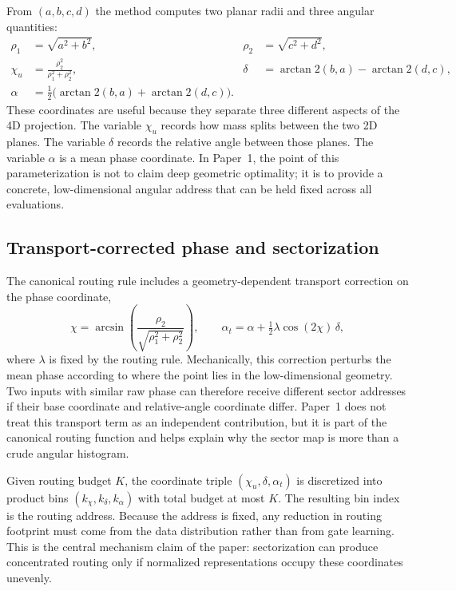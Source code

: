 \documentclass{article}
\begin{document}
From $(a,b,c,d)$ the method computes two planar radii and three angular quantities:
\begin{align}
\rho_1 &= \sqrt{a^2+b^2}, &
\rho_2 &= \sqrt{c^2+d^2}, \\
\chi_u &= \frac{\rho_2^2}{\rho_1^2+\rho_2^2}, &
\delta &= \arctan2(b,a)-\arctan2(d,c), \\
\alpha &= \tfrac{1}{2}\bigl(\arctan2(b,a)+\arctan2(d,c)\bigr). &&
\end{align}
These coordinates are useful because they separate three different aspects of the 4D projection. The variable $\chi_u$ records how mass splits between the two 2D planes. The variable $\delta$ records the relative angle between those planes. The variable $\alpha$ is a mean phase coordinate. In Paper~1, the point of this parameterization is not to claim deep geometric optimality; it is to provide a concrete, low-dimensional angular address that can be held fixed across all evaluations.

\subsection{Transport-corrected phase and sectorization}
The canonical routing rule includes a geometry-dependent transport correction on the phase coordinate,
\begin{equation}
\chi = \arcsin\left(\frac{\rho_2}{\sqrt{\rho_1^2+\rho_2^2}}\right), \qquad
\alpha_t = \alpha + \tfrac{1}{2}\lambda \cos(2\chi)\,\delta,
\label{eq:transport}
\end{equation}
where $\lambda$ is fixed by the routing rule. Mechanically, this correction perturbs the mean phase according to where the point lies in the low-dimensional geometry. Two inputs with similar raw phase can therefore receive different sector addresses if their base coordinate and relative-angle coordinate differ. Paper~1 does not treat this transport term as an independent contribution, but it is part of the canonical routing function and helps explain why the sector map is more than a crude angular histogram.

Given routing budget $K$, the coordinate triple $(\chi_u,\delta,\alpha_t)$ is discretized into product bins $(k_\chi,k_\delta,k_\alpha)$ with total budget at most $K$. The resulting bin index is the routing address. Because the address is fixed, any reduction in routing footprint must come from the data distribution rather than from gate learning. This is the central mechanism claim of the paper: sectorization can produce concentrated routing only if normalized representations occupy these coordinates unevenly.
\end{document}
